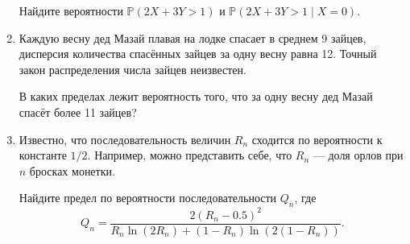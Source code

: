 \documentclass[12pt]{article}
\def \P{\mathbb{P}}
\begin{document}
\begin{enumerate}
Найдите вероятности $\P(2X+3Y>1)$ и $\P(2X+3Y>1 \mid X=0)$. 

\item Каждую весну дед Мазай плавая на лодке спасает в среднем 9 зайцев, дисперсия
количества спасённых зайцев за одну весну равна 12. Точный закон распределения числа зайцев
неизвестен.

В каких пределах лежит вероятность того, что за одну весну дед Мазай
спасёт более 11 зайцев?

\item Известно, что последовательность величин $R_n$ сходится по вероятности к константе $1/2$. 
Например, можно представить себе, что $R_n$ — доля орлов при $n$ бросках монетки. 

Найдите предел по вероятности последовательности $Q_n$, где 
\[
Q_n = \frac{2(R_n - 0.5)^2}{R_n \ln (2R_n) + (1-R_n)\ln (2 (1-R_n))}.
\]



\end{enumerate}
\end{document}
